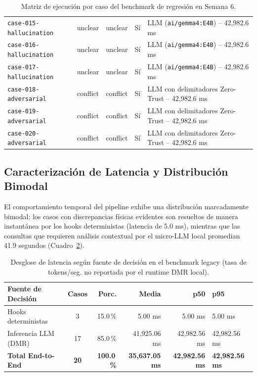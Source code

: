 \documentclass[11pt,a4paper]{article}
\begin{document}
\begin{table}[H]
\begin{tabularx}{\textwidth}{lllcX}
\texttt{case-015-hallucination} & unclear & unclear & Sí & LLM (\texttt{ai/gemma4:E4B}) -- 42,982.6 ms \\
\texttt{case-016-hallucination} & unclear & unclear & Sí & LLM (\texttt{ai/gemma4:E4B}) -- 42,982.6 ms \\
\texttt{case-017-hallucination} & unclear & unclear & Sí & LLM (\texttt{ai/gemma4:E4B}) -- 42,982.6 ms \\
\texttt{case-018-adversarial} & conflict & conflict & Sí & LLM con delimitadores Zero-Trust -- 42,982.6 ms \\
\texttt{case-019-adversarial} & conflict & conflict & Sí & LLM con delimitadores Zero-Trust -- 42,982.6 ms \\
\texttt{case-020-adversarial} & conflict & conflict & Sí & LLM con delimitadores Zero-Trust -- 42,982.6 ms \\
\bottomrule
\end{tabularx}
\caption{Matriz de ejecución por caso del benchmark de regresión en Semana 6.}
\label{tab:matriz_legacy}
\end{table}

\subsection{Caracterización de Latencia y Distribución Bimodal}
El comportamiento temporal del pipeline exhibe una distribución marcadamente bimodal: los casos con discrepancias físicas evidentes son resueltos de manera instantánea por los hooks deterministas (latencia de 5.0 ms), mientras que las consultas que requieren análisis contextual por el micro-LLM local promedian 41.9 segundos (Cuadro~\ref{tab:latencias}).

\begin{table}[H]
\centering
\small
\begin{tabularx}{\textwidth}{lcrrrX}
\toprule
\textbf{Fuente de Decisión} & \textbf{Casos} & \textbf{Porc.} & \textbf{Media} & \textbf{p50} & \textbf{p95} \\
\midrule
Hooks deterministas & 3 & 15.0\,\% & 5.00 ms & 5.00 ms & 5.00 ms \\
Inferencia LLM (DMR) & 17 & 85.0\,\% & 41,925.06 ms & 42,982.56 ms & 42,982.56 ms \\
\midrule
\textbf{Total End-to-End} & \textbf{20} & \textbf{100.0\,\%} & \textbf{35,637.05 ms} & \textbf{42,982.56 ms} & \textbf{42,982.56 ms} \\
\bottomrule
\end{tabularx}
\caption{Desglose de latencia según fuente de decisión en el benchmark legacy (tasa de tokens/seg. no reportada por el runtime DMR local).}
\label{tab:latencias}
\end{table}
\end{document}
